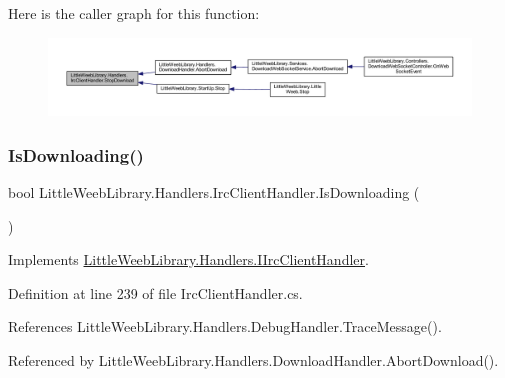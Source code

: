 Here is the caller graph for this function\+:\nopagebreak
\begin{figure}[H]
\begin{center}
\leavevmode
\includegraphics[width=350pt]{class_little_weeb_library_1_1_handlers_1_1_irc_client_handler_a265ca021f5086addf758e87f59a0aa11_icgraph}
\end{center}
\end{figure}
\mbox{\label{class_little_weeb_library_1_1_handlers_1_1_irc_client_handler_a093409b2b1397a6a061e00802546c87b}} 
\subsubsection{\texorpdfstring{Is\+Downloading()}{IsDownloading()}}
{\footnotesize\ttfamily bool Little\+Weeb\+Library.\+Handlers.\+Irc\+Client\+Handler.\+Is\+Downloading (\begin{DoxyParamCaption}{ }\end{DoxyParamCaption})}



Implements \mbox{\hyperlink{interface_little_weeb_library_1_1_handlers_1_1_i_irc_client_handler_abb1d62bc52436a68712fd1b80d9f911e}{Little\+Weeb\+Library.\+Handlers.\+I\+Irc\+Client\+Handler}}.



Definition at line 239 of file Irc\+Client\+Handler.\+cs.



References Little\+Weeb\+Library.\+Handlers.\+Debug\+Handler.\+Trace\+Message().



Referenced by Little\+Weeb\+Library.\+Handlers.\+Download\+Handler.\+Abort\+Download().


